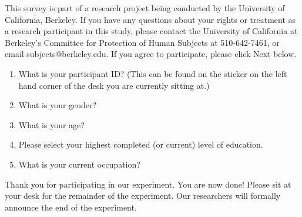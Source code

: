 \documentclass[USenglish,oneside,twocolumn]{article}
\begin{document}
This survey is part of a research project being conducted by the University of California, Berkeley. 
If you have any questions about your rights or treatment as a research participant in this study, please contact the University of California at Berkeley's 
Committee for Protection of Human Subjects at 510-642-7461, or email 
subjects@berkeley.edu. 
If you agree to participate, please click Next below.\\

\begin{enumerate}
\item{What is your participant ID? (This can be found on the sticker on the left hand corner of the desk you are currently sitting at.)}
\item{What is your gender?}
\item{What is your age?}
\item{Please select your highest completed (or current) level of education}.
\item{What is your current occupation?}  
\end{enumerate}

Thank you for participating in our experiment. You are now done! Please sit at your desk for the remainder of the experiment. Our researchers will formally announce the end of the experiment. 
\end{document}
